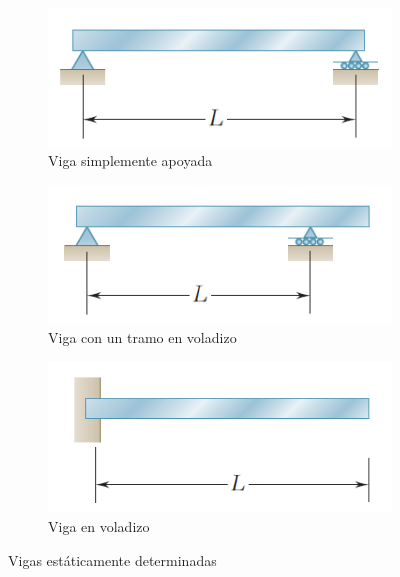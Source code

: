 \documentclass[12pt,letterpaper]{article}
\begin{document}
\begin{figure}[H]
    \centering
    \begin{subfigure}[H]{0.3\textwidth}
        \includegraphics[width=\textwidth]{img/simplemente_apoyada.PNG}
        \caption{Viga simplemente apoyada}
        \label{fig:gull}
    \end{subfigure}
    \begin{subfigure}[H]{0.3\textwidth}
        \includegraphics[width=\textwidth]{img/tramo_en_voladizo.PNG}
        \caption{Viga con un tramo en voladizo}
        \label{fig:tiger}
    \end{subfigure}
    \begin{subfigure}[H]{0.3\textwidth}
        \includegraphics[width=\textwidth]{img/voladizo.PNG}
        \caption{Viga en voladizo}
        \label{fig:mouse}
    \end{subfigure}
    \caption{Vigas estáticamente determinadas}
    \label{fig:vigas_determinadas}
\end{figure}
\end{document}
